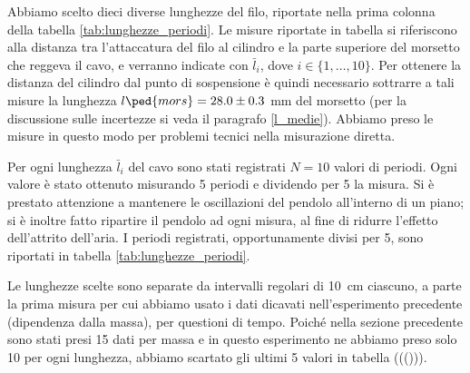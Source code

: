 Abbiamo scelto dieci diverse lunghezze del filo, riportate nella prima colonna della tabella \ref{tab:lunghezze_periodi}.
Le misure riportate in tabella si riferiscono alla distanza tra l'attaccatura del filo al cilindro e la parte superiore
del morsetto che reggeva il cavo, e verranno indicate con $\bar{l}_i$, dove $i \in \{1, \dots, 10\}$.
Per ottenere la distanza del cilindro dal punto di sospensione è quindi necessario sottrarre a tali misure
la lunghezza $l\ped{mors} = 28.0 \pm 0.3$ mm del morsetto (per la discussione sulle incertezze si veda il paragrafo
\ref{l_medie}). Abbiamo preso le misure in questo modo per problemi tecnici nella misurazione diretta.

Per ogni lunghezza $\bar{l}_i$ del cavo sono stati registrati $N = 10$ valori di periodi. Ogni valore è stato ottenuto
misurando 5 periodi e dividendo per 5 la misura. Si è prestato attenzione a mantenere le oscillazioni del pendolo
all'interno di un piano; si è inoltre fatto ripartire il pendolo ad ogni misura, al fine di ridurre l'effetto dell'attrito
dell'aria. I periodi registrati, opportunamente divisi per 5, sono riportati in tabella \ref{tab:lunghezze_periodi}.

Le lunghezze scelte sono separate da intervalli regolari di \SI{10}{\centi\metre} ciascuno, a parte la prima
misura per cui abbiamo usato i dati dicavati nell'esperimento precedente (dipendenza dalla massa), per questioni di tempo.
Poiché nella sezione precedente sono stati presi 15 dati per massa e in questo esperimento ne abbiamo preso solo 10
per ogni lunghezza, abbiamo scartato gli ultimi 5 valori in tabella ((())).

